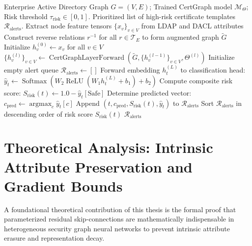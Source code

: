 \begin{algorithm}[ht]
\caption{CertGraph Enterprise Vulnerability Screening and Risk Prioritization}
\label{alg:certgraph_infer}
\begin{algorithmic}[1]
\Require Enterprise Active Directory Graph $G = (V, E)$; Trained CertGraph model $\mathcal{M}_\Theta$; Risk threshold $\tau_{\text{risk}} \in [0, 1]$.
\Ensure Prioritized list of high-risk certificate templates $\mathcal{R}_{\text{alerts}}$.
\State Extract node feature tensors $\{x_v\}_{v \in V}$ from LDAP and DACL attributes
\State Construct reverse relations $r^{-1}$ for all $r \in \mathcal{T}_E$ to form augmented graph $\tilde{G}$
\State Initialize $h_v^{(0)} \gets x_v$ for all $v \in V$
    \State $\{h_v^{(l)}\}_{v \in V} \gets \operatorname{CertGraphLayerForward}(\tilde{G}, \{h_v^{(l-1)}\}_{v \in V}, \Theta^{(l)})$
\EndFor
\State Initialize empty alert queue $\mathcal{R}_{\text{alerts}} \gets []$
    \State Forward embedding $h_t^{(L)}$ to classification head: $\hat{y}_t \gets \operatorname{Softmax}(W_2 \operatorname{ReLU}(W_1 h_t^{(L)} + b_1) + b_2)$
    \State Compute composite risk score: $S_{\text{risk}}(t) \gets 1.0 - \hat{y}_t[\text{Safe}]$
    \State Determine predicted vector: $c_{\text{pred}} \gets \operatorname{argmax}_{c} \hat{y}_t[c]$
        \State Append $(t, c_{\text{pred}}, S_{\text{risk}}(t), \hat{y}_t)$ to $\mathcal{R}_{\text{alerts}}$
    \EndIf
\EndFor
\State Sort $\mathcal{R}_{\text{alerts}}$ in descending order of risk score $S_{\text{risk}}(t)$
\State \Return $\mathcal{R}_{\text{alerts}}$
\end{algorithmic}
\end{algorithm}

\section{Theoretical Analysis: Intrinsic Attribute Preservation and Gradient Bounds}
\label{sec:theorem1_discussion}
A foundational theoretical contribution of this thesis is the formal proof that parameterized residual skip-connections are mathematically indispensable in heterogeneous security graph neural networks to prevent intrinsic attribute erasure and representation decay.

